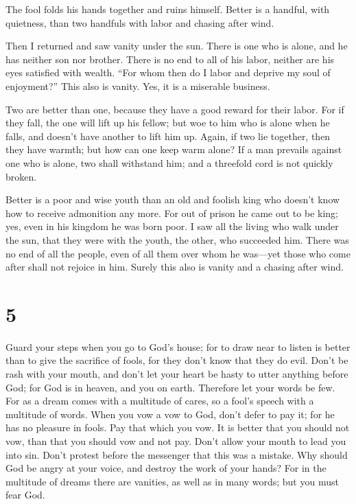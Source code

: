 The fool folds his hands together and ruins himself.
 Better is a handful, with quietness, than two handfuls with
labor and chasing after wind.

 Then I returned and saw vanity under the sun. 
There is one who is alone, and he has neither son nor brother. There is
no end to all of his labor, neither are his eyes satisfied with wealth.
``For whom then do I labor and deprive my soul of enjoyment?'' This also
is vanity. Yes, it is a miserable business.

 Two are better than one, because they have a good reward
for their labor.  For if they fall, the one will lift up
his fellow; but woe to him who is alone when he falls, and doesn't have
another to lift him up.  Again, if two lie together, then
they have warmth; but how can one keep warm alone?  If a
man prevails against one who is alone, two shall withstand him; and a
threefold cord is not quickly broken.

 Better is a poor and wise youth than an old and foolish
king who doesn't know how to receive admonition any more. 
For out of prison he came out to be king; yes, even in his kingdom he
was born poor.  I saw all the living who walk under the
sun, that they were with the youth, the other, who succeeded him.
 There was no end of all the people, even of all them over
whom he was---yet those who come after shall not rejoice in him. Surely
this also is vanity and a chasing after wind.

\hypertarget{section-4}{%
\section{5}\label{section-4}}

 Guard your steps when you go to God's house; for to draw
near to listen is better than to give the sacrifice of fools, for they
don't know that they do evil.  Don't be rash with your
mouth, and don't let your heart be hasty to utter anything before God;
for God is in heaven, and you on earth. Therefore let your words be few.
 For as a dream comes with a multitude of cares, so a fool's
speech with a multitude of words.  When you vow a vow to
God, don't defer to pay it; for he has no pleasure in fools. Pay that
which you vow.  It is better that you should not vow, than
that you should vow and not pay.  Don't allow your mouth to
lead you into sin. Don't protest before the messenger that this was a
mistake. Why should God be angry at your voice, and destroy the work of
your hands?  For in the multitude of dreams there are
vanities, as well as in many words; but you must fear God.

